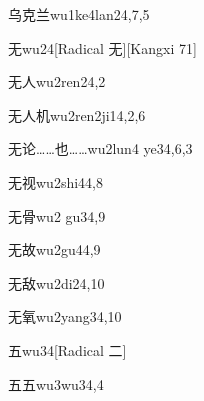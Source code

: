 \begin{verbete}{乌克兰}{wu1ke4lan2}{4,7,5}
\end{verbete}

\begin{verbete}{无}{wu2}{4}[Radical 无][Kangxi 71]
\end{verbete}

\begin{verbete}{无人}{wu2ren2}{4,2}
\end{verbete}

\begin{verbete}{无人机}{wu2ren2ji1}{4,2,6}
\end{verbete}

\begin{verbete}{无论……也……}{wu2lun4 ye3}{4,6,3}
\end{verbete}

\begin{verbete}{无视}{wu2shi4}{4,8}
\end{verbete}

\begin{verbete}{无骨}{wu2 gu3}{4,9}
\end{verbete}

\begin{verbete}{无故}{wu2gu4}{4,9}
\end{verbete}

\begin{verbete}{无敌}{wu2di2}{4,10}
\end{verbete}

\begin{verbete}{无氧}{wu2yang3}{4,10}
\end{verbete}

\begin{verbete}{五}{wu3}{4}[Radical 二]
\end{verbete}

\begin{verbete}{五五}{wu3wu3}{4,4}
\end{verbete}

